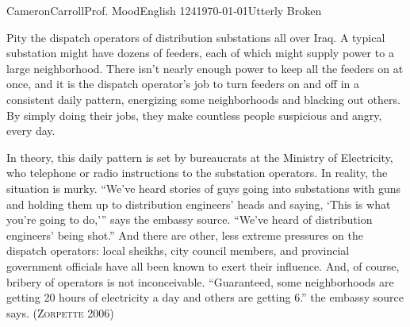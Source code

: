 \begin{mla}{Cameron}{Carroll}{Prof. Mood}{English 124}{\today}{Utterly Broken}
\vspace{3mm}

\begin{fancyquotes}
 Pity the dispatch operators of distribution substations all over Iraq. A typical substation might have dozens of feeders, each of which might supply power to a large neighborhood. There isn't nearly enough power to keep all the feeders on at once, and it is the dispatch operator's job to turn feeders on and off in a consistent daily pattern, energizing some neighborhoods and blacking out others. By simply doing their jobs, they make countless people suspicious and angry, every day.

 In theory, this daily pattern is set by bureaucrats at the Ministry of Electricity, who telephone or radio instructions to the substation operators. In reality, the situation is murky. ``We've heard stories of guys going into substations with guns and holding them up to distribution engineers' heads and saying, `This is what you're going to do,''' says the embassy source. ``We've heard of distribution engineers' being shot.'' And there are other, less extreme pressures on the dispatch operators: local sheikhs, city council members, and provincial government officials have all been known to exert their influence. And, of course, bribery of operators is not inconceivable. ``Guaranteed, some neighborhoods are getting 20 hours of electricity a day and others are getting 6.'' the embassy source says. \textsc{(Zorpette 2006)}
\end{fancyquotes}

\end{mla}
